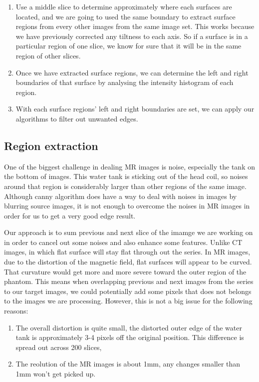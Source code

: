 \begin{enumerate}
  \item Use a middle slice to determine approximately where each surfaces are located, and we are going to
    used the same boundary to extract surface regions from every other images from the same image set. This 
    works because we have previously corrected any tiltness to each axis. So if a surface is in a particular
    region of one slice, we know for sure that it will be in the same region of other slices.
  \item Once we have extracted surface regions, we can determine the left and right boundaries of that surface
    by analysing the intensity histogram of each region.
  \item With each surface regions' left and right boundaries are set, we can apply our algorithms to filter out
    unwanted edges.
\end{enumerate}

\subsection{Region extraction}

One of the biggest challenge in dealing MR images is noise, especially the tank on the bottom of images. 
This water tank is sticking out of the head coil, so noises around that region is considerably larger than
other regions of the same image. Although canny algorithm does have a way to deal with noises in images by 
blurring source images, it is not enough to overcome the noises in MR images in order for us to get a very
good edge result.

Our approach is to sum previous and next slice of the imamge we are working on in order to cancel out some
noises and also enhance some features. Unlike CT images, in which flat surface will stay flat through out the
series. In MR images, due to the distortion of the magnetic field, flat surfaces will appear to be curved.
That curvature would get more and more severe toward the outer region of the phantom. This means when
overlapping previous and next images from the series to our target images, we could potentially add some 
pixels that does not belongs to the images we are processing. However, this is not a big issue for the
following reasons:

\begin{enumerate}
\item The overall distortion is quite small, the distorted outer edge of the water tank is approximately 
  3-4 pixels off the original position. This difference is spread out across 200 slices,
\item The reolution of the MR images is about 1mm, any changes smaller than 1mm won't get picked up. 
\end{enumerate}

